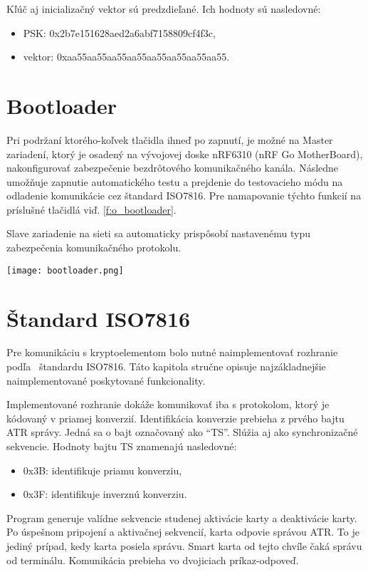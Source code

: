 \documentclass[12pt,a4paper,oneside,openright]{report}
\newcommand{\quotes}[1]{``#1''}
\begin{document}
Kľúč aj inicializačný vektor sú predzdieľané.
Ich hodnoty sú nasledovné:
	\singlespacing
\begin{itemize}
	\item PSK:    \tabto{1.5cm}0x2b7e151628aed2a6abf7158809cf4f3c,
	\item vektor: \tabto{1.5cm}0xaa55aa55aa55aa55aa55aa55aa55aa55.
\end{itemize}
	\onehalfspacing

\section{Bootloader} \label{bootloader}
	Pri podržaní ktorého-koľvek tlačidla ihneď po zapnutí, je možné na Master zariadení, ktorý je osadený na vývojovej doske nRF6310 (nRF Go MotherBoard), nakonfigurovať zabezpečenie bezdrôtového komunikačného kanála. Následne umožňuje zapnutie automatického testu a prejdenie do testovacieho módu na odladenie komunikácie cez štandard ISO7816.
Pre namapovanie týchto funkcií na príslušné tlačidlá viď. \ref{f:o_bootloader}.
	
	Slave zariadenie na sieti sa automaticky prispôsobí nastavenému typu zabezpečenia komunikačného protokolu.
\begin{figure*}[!htb]
	\centering
	\texttt{[image: bootloader.png]}
	\caption{Konfigurácia nastavení po zapnutí\cite{nrfug}.}
	\label{f:o_bootloader}
\end{figure*}

\section{Štandard ISO7816}
	Pre komunikáciu s kryptoelementom bolo nutné naimplementovať rozhranie podľa~ štandardu ISO7816. Táto kapitola stručne opisuje najzákladnejšie naimplementované poskytované funkcionality.
	
	Implementované rozhranie dokáže komunikovať iba s protokolom, ktorý je kódovaný v priamej konverzií. Identifikácia konverzie prebieha z prvého bajtu ATR správy. Jedná sa o bajt označovaný ako \quotes{TS}. Slúžia aj ako synchronizačné sekvencie. Hodnoty bajtu TS znamenajú nasledovné:
	\begin{itemize}
		\item 0x3B: identifikuje priamu konverziu,
		\item 0x3F: identifikuje inverznú konverziu.
	\end{itemize}
	\onehalfspacing
	
	Program generuje valídne sekvencie studenej aktivácie karty a deaktivácie karty. Po úspešnom pripojení a aktivačnej sekvencií, karta odpovie správou ATR. To je jediný prípad, kedy karta posiela správu. Smart karta od tejto chvíle čaká správu od terminálu. Komunikácia prebieha vo dvojiciach príkaz-odpoveď.
	
\end{document}
